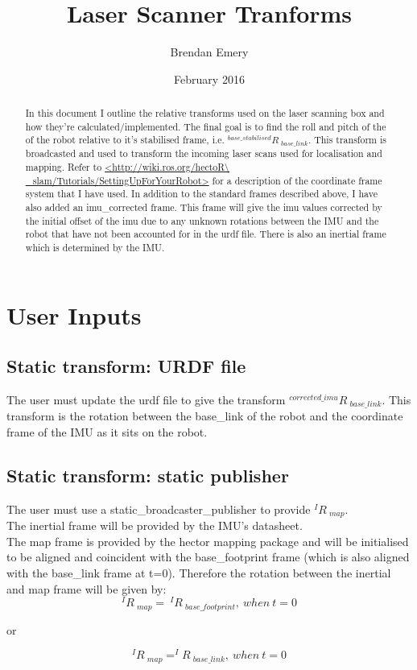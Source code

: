 \documentclass{article}
\title{Laser Scanner Tranforms}
\author{Brendan Emery}
\date{February 2016}
\begin{document}
\maketitle

\begin{abstract}
\noindent In this document I outline the relative transforms used on the laser scanning box and how they're calculated/implemented. The final goal is to find the roll and pitch of the of the robot relative to it's stabilised frame, i.e. $ {^{base\_stabilised}R\ _{base\_link}} $. This transform is broadcasted and used to transform the incoming laser scans used for localisation and mapping. Refer to \url{<http://wiki.ros.org/hectoR\ _slam/Tutorials/SettingUpForYourRobot>} for a description of the coordinate frame system that I have used. In addition to the standard frames described above, I have also added an imu\_corrected frame. This frame will give the imu values corrected by the initial offset of the imu due to any unknown rotations between the IMU and the robot that have not been accounted for in the urdf file. There is also an inertial frame which is determined by the IMU.
\end{abstract}

\section{User Inputs}

\subsection{Static transform: URDF file}
The user must update the urdf file to give the transform $ {^{corrected\_imu}R\ _{base\_link}} $. This transform is the rotation between the base\_link of the robot and the coordinate frame of the IMU as it sits on the robot.

\subsection{Static transform: static publisher}
The user must use a static\_broadcaster\_publisher to provide $ {^{I}R\ _{map}}$.\\

The inertial frame will be provided by the IMU's datasheet.\\

The map frame is provided by the hector mapping package and will be initialised to be aligned and coincident with the base\_footprint frame (which is also aligned with the base\_link frame at t=0). Therefore the rotation between the inertial and map frame will be given by:
\begin{equation}
^{I}R\ _{map} =\ ^{I}R\ _{base\_footprint},\ when\ t=0
\end{equation}
\begin{center}
or
\end{center}
\begin{equation}
^{I}R\ _{map}=^{I}R\ _{base\_link},\ when\ t=0
\end{equation}
\end{document}
